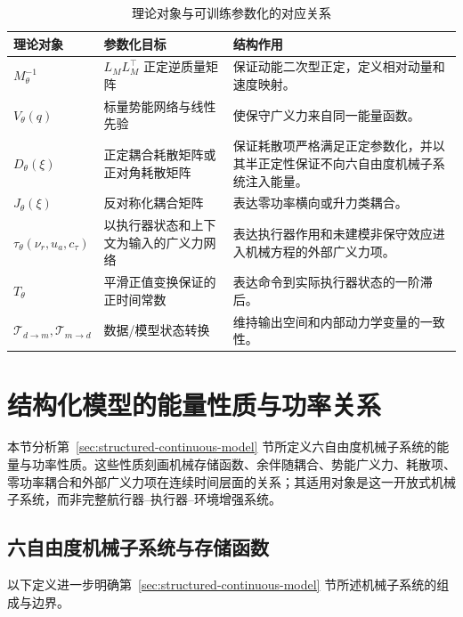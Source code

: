 \documentclass[UTF8,zihao=-4]{ctexrep}
\begin{document}
\begin{table}[htbp]
  \centering
  \caption{理论对象与可训练参数化的对应关系}
  \label{tab:implementation-map}
  \begin{tabularx}{\textwidth}{>{\raggedright\arraybackslash}p{}>{\raggedright\arraybackslash}p{}>{\raggedright\arraybackslash}X}
    \toprule
    理论对象 & 参数化目标 & 结构作用 \\
    \midrule
    \(M_\theta^{-1}\) & \(L_ML_M^\top\) 正定逆质量矩阵 & 保证动能二次型正定，定义相对动量和速度映射。 \\
    \(V_\theta(q)\) & 标量势能网络与线性先验 & 使保守广义力来自同一能量函数。 \\
    \(D_\theta(\xi)\) & 正定耦合耗散矩阵或正对角耗散矩阵 & 保证耗散项严格满足正定参数化，并以其半正定性保证不向六自由度机械子系统注入能量。 \\
    \(J_\theta(\xi)\) & 反对称化耦合矩阵 & 表达零功率横向或升力类耦合。 \\
    \(\tau_\theta(\nu_r,u_a,c_\tau)\) & 以执行器状态和上下文为输入的广义力网络 & 表达执行器作用和未建模非保守效应进入机械方程的外部广义力项。 \\
    \(T_\theta\) & 平滑正值变换保证的正时间常数 & 表达命令到实际执行器状态的一阶滞后。 \\
    \(\mathcal{T}_{d\to m},\mathcal{T}_{m\to d}\) & 数据/模型状态转换 & 维持输出空间和内部动力学变量的一致性。 \\
    \bottomrule
  \end{tabularx}
\end{table}

\section{结构化模型的能量性质与功率关系}
\label{sec:energy-power-properties}

本节分析第~\ref{sec:structured-continuous-model} 节所定义六自由度机械子系统的能量与功率性质。这些性质刻画机械存储函数、余伴随耦合、势能广义力、耗散项、零功率耦合和外部广义力项在连续时间层面的关系；其适用对象是这一开放式机械子系统，而非完整航行器--执行器--环境增强系统。

\subsection{六自由度机械子系统与存储函数}

以下定义进一步明确第~\ref{sec:structured-continuous-model} 节所述机械子系统的组成与边界。
\end{document}
